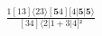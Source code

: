 \documentclass[varwidth, border=5pt]{standalone}
\begin{document}
\begin{my}
$\begin{gathered}
\scriptscriptstyle\frac{1[13]⟨23⟩[𝟓4][4|𝟓|𝟓⟩}{[34]⟨2|1+3|4]²}
\end{gathered}$
\end{my}
\end{document}
